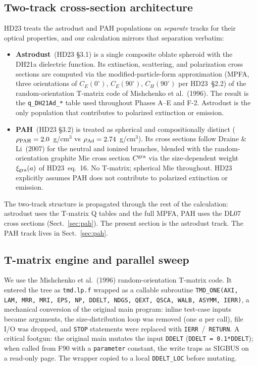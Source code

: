 \documentclass{my_memo}
\begin{document}
\subsection{Two-track cross-section architecture}

HD23 treats the astrodust and PAH populations on \emph{separate} tracks
for their optical properties, and our calculation mirrors that separation
verbatim:

\begin{itemize}
  \item \textbf{Astrodust}~(HD23 \S3.1) is a single composite oblate
        spheroid with the DH21a dielectric function. Its extinction,
        scattering, and polarization cross sections are computed via
        the modified-particle-form approximation (MPFA, three
        orientations of $C_E(0^\circ)$, $C_E(90^\circ)$, $C_H(90^\circ)$
        per HD23~\S2.2) of the random-orientation T-matrix code of
        Mishchenko et al.~(1996). The result is the
        \texttt{q\_DH21Ad\_*} table used throughout Phases A--E and
        F-2. Astrodust is the only population that contributes to
        polarized extinction or emission.
  \item \textbf{PAH}~(HD23 \S3.2) is treated as spherical and
        compositionally distinct ($\rho_{\rm PAH} = 2.0$~g/cm$^3$ vs
        $\rho_{\rm Ad} = 2.74$~g/cm$^3$). Its cross sections follow
        Draine \& Li~(2007) for the neutral and ionized branches,
        blended with the random-orientation graphite Mie cross section
        $C^{\rm gra}$ via the size-dependent weight $\xi_{\rm gra}(a)$
        of HD23~eq.~16. No T-matrix; spherical Mie throughout. HD23
        explicitly assumes PAH does not contribute to polarized
        extinction or emission.
\end{itemize}

The two-track structure is propagated through the rest of the
calculation: astrodust uses the T-matrix Q tables and the full MPFA,
PAH uses the DL07 cross sections (Sect.~\ref{sec:pah}). The
present section is the astrodust track. The PAH track lives in
Sect.~\ref{sec:pah}.

\subsection{T-matrix engine and parallel sweep}

We use the Mishchenko et al.\ (1996) random-orientation T-matrix code. It
entered the tree as \texttt{tmd.lp.f} wrapped as a callable subroutine
\texttt{TMD\_ONE(AXI, LAM, MRR, MRI, EPS, NP, DDELT, NDGS,
QEXT, QSCA, WALB, ASYMM, IERR)}, a mechanical
conversion of the original main program: inline test-case inputs became
arguments, the size-distribution loop was removed (one $a$ per call),
file I/O was dropped, and \texttt{STOP} statements were replaced with
\texttt{IERR}~/~\texttt{RETURN}. A critical footgun: the original main
mutates the input \texttt{DDELT} (\texttt{DDELT~=~0.1*DDELT}); when
called from F90 with a \texttt{parameter} constant, the write traps as
SIGBUS on a read-only page. The wrapper copied to a local
\texttt{DDELT\_LOC} before mutating.
\end{document}
